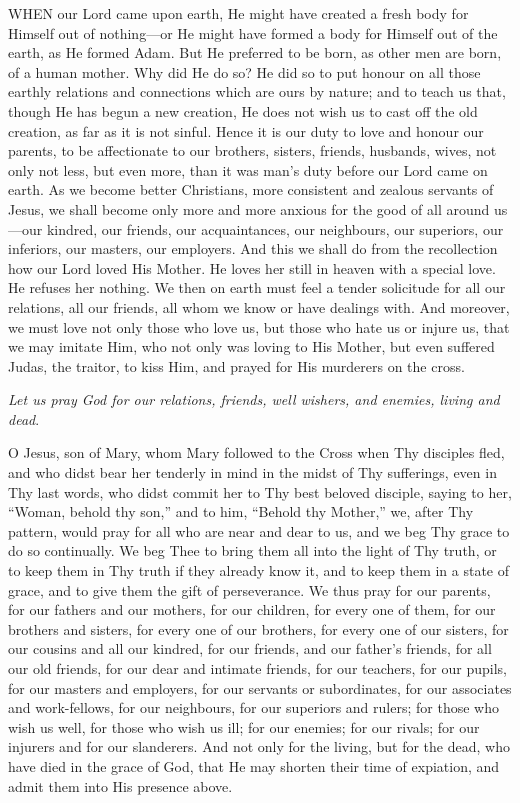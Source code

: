 
WHEN our Lord came
upon earth, He might have created a fresh body for Himself out of
nothing—or He might have formed a body for Himself out of the earth,
as He formed Adam. But He preferred to be born, as other men are born,
of a human mother. Why did He do so? He did so to put honour on all
those earthly relations and connections which are ours by nature; and to
teach us that, though He has begun a new creation, He does not wish us
to cast off the old creation, as far as it is not sinful. Hence it is
our duty to love and honour our parents, to be affectionate to our
brothers, sisters, friends, husbands, wives, not only not less, but even
more, than it was man's duty before our Lord came on earth. As we become
better Christians, more consistent and zealous servants of Jesus, we
shall become only more and more anxious for the good of all around
us—our kindred, our friends, our acquaintances, our neighbours, our
superiors, our inferiors, our masters, our employers. And this we shall
do from the recollection how our Lord loved His Mother. He loves her
still in heaven with a special love. He refuses her nothing. We then on
earth must feel a tender solicitude for all our relations, all our
friends, all whom we know or have dealings with. And moreover, we must
love not only those who love us, but those who hate us or injure
us, that we may imitate Him, who not only was loving to His Mother, but
even suffered Judas, the traitor, to kiss Him, and prayed for His
murderers on the cross.

\emph{Let us pray God for our
relations, friends, well wishers, and enemies, living and dead}.

O Jesus, son of Mary, whom Mary
followed to the Cross when Thy disciples fled, and who didst bear her
tenderly in mind in the midst of Thy sufferings, even in Thy last words,
who didst commit her to Thy best beloved disciple, saying to her, ``Woman,
behold thy son,'' and to him, ``Behold thy Mother,'' we, after Thy pattern,
would pray for all who are near and dear to us, and we beg Thy grace to
do so continually. We beg Thee to bring them all into the light of Thy
truth, or to keep them in Thy truth if they already know it, and to keep
them in a state of grace, and to give them the gift of perseverance. We
thus pray for our parents, for our fathers and our mothers, for our
children, for every one of them, for our brothers and sisters, for every
one of our brothers, for every one of our sisters, for our cousins and
all our kindred, for our friends, and our father's friends, for all our
old friends, for our dear and intimate friends, for our teachers, for
our pupils, for our masters and employers, for our servants or
subordinates, for our associates and work-fellows, for our neighbours,
for our superiors and rulers; for those who wish us well, for those who
wish us ill; for our enemies; for our rivals; for our injurers and
for our slanderers. And not only for the living, but for the dead, who
have died in the grace of God, that He may shorten their time of
expiation, and admit them into His presence above.


